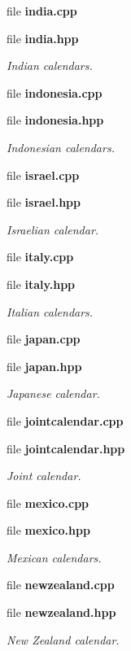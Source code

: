 \begin{DoxyCompactItemize}
file {\bf india.\+cpp}
\item 
file {\bf india.\+hpp}
\begin{DoxyCompactList}\small\item\em Indian calendars. \end{DoxyCompactList}\item 
file {\bf indonesia.\+cpp}
\item 
file {\bf indonesia.\+hpp}
\begin{DoxyCompactList}\small\item\em Indonesian calendars. \end{DoxyCompactList}\item 
file {\bf israel.\+cpp}
\item 
file {\bf israel.\+hpp}
\begin{DoxyCompactList}\small\item\em Israelian calendar. \end{DoxyCompactList}\item 
file {\bf italy.\+cpp}
\item 
file {\bf italy.\+hpp}
\begin{DoxyCompactList}\small\item\em Italian calendars. \end{DoxyCompactList}\item 
file {\bf japan.\+cpp}
\item 
file {\bf japan.\+hpp}
\begin{DoxyCompactList}\small\item\em Japanese calendar. \end{DoxyCompactList}\item 
file {\bf jointcalendar.\+cpp}
\item 
file {\bf jointcalendar.\+hpp}
\begin{DoxyCompactList}\small\item\em Joint calendar. \end{DoxyCompactList}\item 
file {\bf mexico.\+cpp}
\item 
file {\bf mexico.\+hpp}
\begin{DoxyCompactList}\small\item\em Mexican calendars. \end{DoxyCompactList}\item 
file {\bf newzealand.\+cpp}
\item 
file {\bf newzealand.\+hpp}
\begin{DoxyCompactList}\small\item\em New Zealand calendar. \end{DoxyCompactList}\item 

\end{DoxyCompactItemize}
